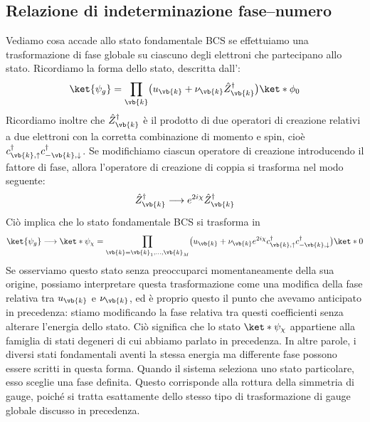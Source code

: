 \subsection{Relazione di indeterminazione fase--numero}
Vediamo cosa accade allo stato fondamentale BCS se effettuiamo una trasformazione di fase globale su ciascuno degli elettroni che partecipano allo stato. Ricordiamo la forma dello stato, descritta dall':
\begin{equation*}
   \ket{\psi_g}
   =\prod_{\vb{k}} \bigl( u_{\vb{k}} + \nu_{\vb{k}} \hat{Z}^{\dag}_{\vb{k}} \bigr) \ket*{\phi_0}
\end{equation*}
Ricordiamo inoltre che $\hat{Z}^{\dag}_{\vb{k}}$ è il prodotto di due operatori di creazione relativi a due elettroni con la corretta combinazione di momento e spin, cioè $c^{\dag}_{\vb{k},\uparrow} c^{\dag}_{-\vb{k},\downarrow}$. Se modifichiamo ciascun operatore di creazione introducendo il fattore di fase, allora l'operatore di creazione di coppia si trasforma nel modo seguente:
\begin{equation*}
   \hat{Z}^{\dag}_{\vb{k}}
   \longrightarrow
   e^{2i\chi} \hat{Z}^{\dag}_{\vb{k}}
\end{equation*}
Ciò implica che lo stato fondamentale BCS si trasforma in
\begin{equation*}
   \ket{\psi_g}
   \longrightarrow
   \ket*{\psi_{\chi}}
   =
   \prod_{\vb{k}=\vb{k}_1,\ldots,\vb{k}_M}
   \bigl(
      u_{\vb{k}}
      +
      \nu_{\vb{k}} e^{2i\chi}
      c^{\dag}_{\vb{k},\uparrow}
      c^{\dag}_{-\vb{k},\downarrow}
   \bigr)\ket*{0}
\end{equation*}
Se osserviamo questo stato senza preoccuparci momentaneamente della sua origine, possiamo interpretare questa trasformazione come una modifica della fase relativa tra $u_{\vb{k}}$ e $\nu_{\vb{k}}$, ed è proprio questo il punto che avevamo anticipato in precedenza: stiamo modificando la fase relativa tra questi coefficienti senza alterare l'energia dello stato. Ciò significa che lo stato $\ket*{\psi_{\chi}}$ appartiene alla famiglia di stati degeneri di cui abbiamo parlato in precedenza. In altre parole, i diversi stati fondamentali aventi la stessa energia ma differente fase possono essere scritti in questa forma. Quando il sistema seleziona uno stato particolare, esso sceglie una fase definita. Questo corrisponde alla rottura della simmetria di gauge, poiché si tratta esattamente dello stesso tipo di trasformazione di gauge globale discusso in precedenza.\\

